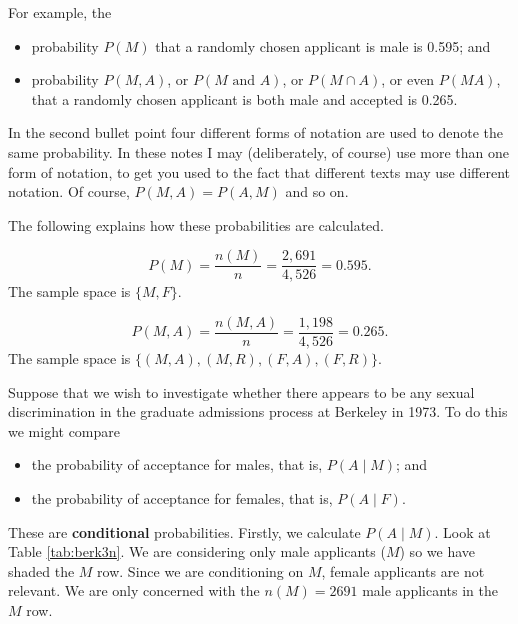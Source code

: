 \documentclass[
  11pt,
  british,
  openany, a4paper]{book}
\providecommand{\tightlist}{%
  \setlength{\itemsep}{0pt}\setlength{\parskip}{0pt}}
\begin{document}
For example, the

\begin{itemize}
\tightlist
\item
  probability \(P(M)\) that a randomly chosen applicant is male is 0.595; and
\item
  probability \(P(M, A)\), or \(P(M \mbox{ and } A)\), or \(P(M \cap A)\), or even \(P(MA)\), that a randomly chosen applicant is both male and accepted is 0.265.
\end{itemize}

In the second bullet point four different forms of notation are used to denote the same probability. In these notes I may (deliberately, of course) use more than one form of notation, to get you used to the fact that different texts may use different notation. Of course, \(P(M, A) = P(A, M)\) and so on.

The following explains how these probabilities are calculated.

\[P(M) = \frac{n(M)}{n} = \frac{2,691}{4,526} = 0.595.\]
The sample space is \(\{M,F\}\).

\[P(M , A) = \frac{n(M , A)}{n} = \frac{1,198}{4,526} = 0.265.\]
The sample space is \(\{(M , A),(M , R),(F , A),(F , R)\}\).

Suppose that we wish to investigate whether there appears to be any sexual discrimination in the graduate admissions process at Berkeley in 1973. To do this we might compare

\begin{itemize}
\tightlist
\item
  the probability of acceptance for males, that is, \(P(A \mid M)\); and
\item
  the probability of acceptance for females, that is, \(P(A \mid F)\).
\end{itemize}

These are \textbf{conditional} probabilities. Firstly, we calculate \(P(A \mid M)\). Look at Table \ref{tab:berk3n}. We are considering only male applicants (\(M\)) so we have shaded the \(M\) row. Since we are conditioning on \(M\), female applicants are not relevant. We are only concerned with the \(n(M)=2691\) male applicants in the \(M\) row.

 
  \providecommand{\huxb}[2]{\arrayrulecolor[RGB]{#1}\global\arrayrulewidth=#2pt}
  \providecommand{\huxvb}[2]{\color[RGB]{#1}\vrule width #2pt}
  \providecommand{\huxtpad}[1]{\rule{0pt}{#1}}
  \providecommand{\huxbpad}[1]{\rule[-#1]{0pt}{#1}}
\end{document}
